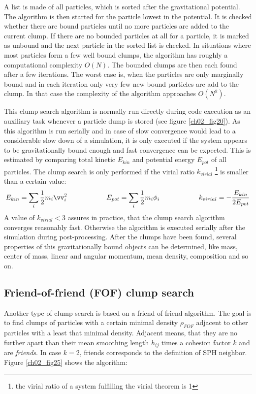 A list is made of all particles, which is sorted after the gravitational potential. The algorithm is then started for the particle lowest in the potential. It is checked whether there are bound particles until no more particles are added to the current clump. If there are no bounded particles at all for a particle, it is marked as unbound and the next particle in the sorted list is checked. In situations where most particles form a few well bound clumps, the algorithm has roughly a computational complexity $O(N)$. The bounded clumps are then each found after a few iterations. The worst case is, when the particles are only marginally bound and in each iteration only very few new bound particles are add to the clump. In that case the complexity of the algorithm approaches $O(N^2)$. 

This clump search algorithm is normally run directly during code execution as an auxiliary task whenever a particle dump is stored (see figure \ref{ch02_fig20}). As this algorithm is run serially and in case of slow convergence would lead to a considerable slow down of a simulation, it is only executed if the system appears to be gravitationally bound enough and fast convergence can be expected. This is estimated by comparing total kinetic $E_{kin}$ and potential energy $E_{pot}$ of all particles. The clump search is only performed if the virial ratio $k_{virial}$ \footnote{the virial ratio of a system fulfilling the virial theorem is 1} is smaller than a certain value:
\begin{align}
\label{ch02_aux_eq015}
E_{kin} = \sum_i \frac{1}{2} m_i \vv_i^2 \hspace{2.0cm} E_{pot} = \sum_i \frac{1}{2} m_i \phi_i \hspace{2.0cm} k_{virial} = - \frac{E_{kin}}{2 E_{pot}}
\end{align}
A value of $k_{virial} < 3$ assures in practice, that the clump search algorithm converges reasonably fast. Otherwise the algorithm is executed serially after the simulation during post-processing. After the clumps have been found, several properties of this gravitationally bound objects can be determined, like mass, center of mass, linear and angular momentum, mean density, composition and so on.

\subsection{Friend-of-friend (FOF) clump search}
Another type of clump search is based on a friend of friend algorithm. The goal is to find clumps of particles with a certain minimal density $\rho_{FOF}$ adjacent to other particles with a least that minimal density. Adjacent means, that they are no further apart than their mean smoothing length $h_{ij}$ times a cohesion factor $k$ and are \emph{friends}. In case $k=2$, friends corresponds to the definition of SPH neighbor. Figure \ref{ch02_fig25} shows the algorithm:

